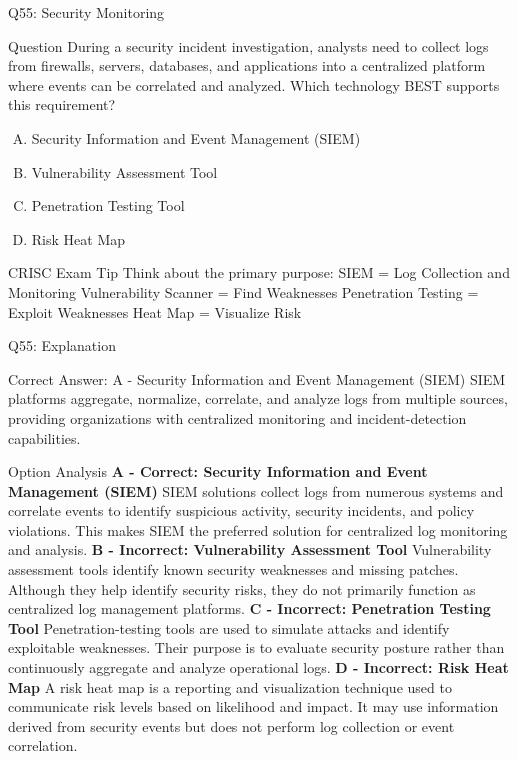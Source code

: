 \documentclass{beamer}
\begin{document}
	
	\begin{frame}{Q55: Security Monitoring} \begin{block}{Question} During a security incident investigation, analysts need to collect logs from firewalls, servers, databases, and applications into a centralized platform where events can be correlated and analyzed. Which technology BEST supports this requirement? \end{block} \begin{enumerate}[(A)] \item Security Information and Event Management (SIEM) \item Vulnerability Assessment Tool \item Penetration Testing Tool \item Risk Heat Map \end{enumerate}
	
	
	\begin{block}{CRISC Exam Tip} Think about the primary purpose: SIEM = Log Collection and Monitoring Vulnerability Scanner = Find Weaknesses Penetration Testing = Exploit Weaknesses Heat Map = Visualize Risk \end{block}
	
	 \end{frame} \begin{frame}[shrink=10]{Q55: Explanation} \footnotesize \begin{block}{Correct Answer: A - Security Information and Event Management (SIEM)} SIEM platforms aggregate, normalize, correlate, and analyze logs from multiple sources, providing organizations with centralized monitoring and incident-detection capabilities. \end{block} \begin{block}{Option Analysis} \textbf{A - Correct: Security Information and Event Management (SIEM)} SIEM solutions collect logs from numerous systems and correlate events to identify suspicious activity, security incidents, and policy violations. This makes SIEM the preferred solution for centralized log monitoring and analysis. \vspace{0.15cm} \textbf{B - Incorrect: Vulnerability Assessment Tool} Vulnerability assessment tools identify known security weaknesses and missing patches. Although they help identify security risks, they do not primarily function as centralized log management platforms. \vspace{0.15cm} \textbf{C - Incorrect: Penetration Testing Tool} Penetration-testing tools are used to simulate attacks and identify exploitable weaknesses. Their purpose is to evaluate security posture rather than continuously aggregate and analyze operational logs. \vspace{0.15cm} \textbf{D - Incorrect: Risk Heat Map} A risk heat map is a reporting and visualization technique used to communicate risk levels based on likelihood and impact. It may use information derived from security events but does not perform log collection or event correlation. \end{block}  \end{frame}
	
\end{document}
